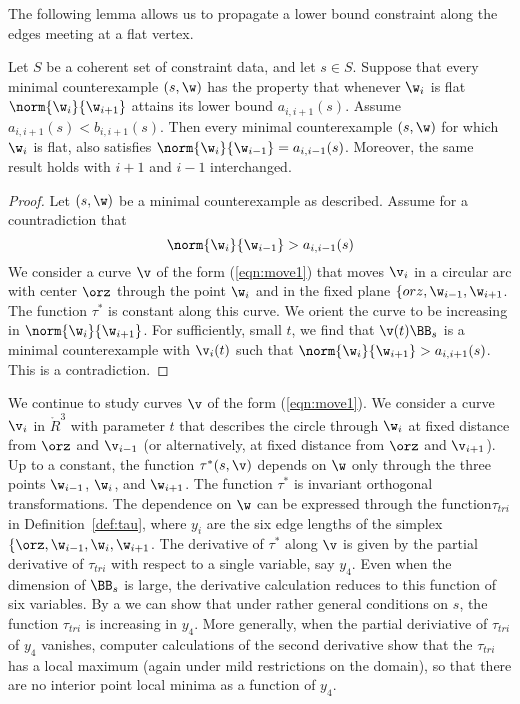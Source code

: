 The following lemma allows us to propagate a lower bound constraint
along the edges meeting at a flat vertex.

\begin{lemma} Let $S$ be a coherent set of constraint data, and let $s\in S$.
Suppose that every minimal counterexample $(s,\w)$ has the
property that whenever $\w_i$ is flat $\norm{\w_i}{\w_{i+1}}$ attains its
lower bound $a_{i,i+1}(s)$.   Assume $a_{i,i+1}(s)<b_{i,i+1}(s)$.
Then every minimal counterexample $(s,\w)$
for which $\w_i$ is flat, also satisfies $\norm{\w_i}{\w_{i-1}}=a_{i,i-1}(s)$.
Moreover, the same result holds with $i+1$ and $i-1$ interchanged.
\end{lemma}

\begin{proof}
Let $(s,\w)$ be a minimal counterexample as described.
Assume for a countradiction that 
\[
\norm{\w_i}{\w_{i-1}}>a_{i,i-1}(s)
\]
We consider a curve $\v$ of the form (\ref{eqn:move1}) that moves $\v_i$
in a circular arc with center $\orz$ through the point $\w_i$ and in
the fixed plane $\{orz,\w_{i-1},\w_{i+1}$.  The function $\tau^*$ is
constant along this curve.  We orient the curve to be increasing
in $\norm{\w_i}{\w_{i+1}}$.  For sufficiently, small $t$, we find that
$\v(t)\BB_s$ is a minimal counterexample with $\v_i(t)$ such that
$\norm{\w_i}{\w_{i+1}} > a_{i,i+1}(s)$. This is a contradiction.
\end{proof}

\begin{remark}\label{rem:contract}
  We continue to study curves $\v$ of the form (\ref{eqn:move1}).  We
  consider a curve $\v_i$ in $\ring{R}^3$ with parameter $t$ that
  describes the circle through $\w_i$ at fixed distance from $\orz$
  and $\v_{i-1}$ (or alternatively, at fixed distance from $\orz$ and
  $\v_{i+1}$).  Up to a constant, the function $\tau^*(s,\v)$ depends
  on $\w$ only through the three points $\w_{i-1}$, $\w_i$, and
  $\w_{i+1}$.  The function $\tau^*$ is invariant orthogonal
  transformations.  The dependence on $\w$ can be expressed through
  the function$\tau_{tri}$ in Definition~\ref{def:tau}, where $y_i$
  are the six edge lengths of the simplex
  $\{\orz,\w_{i-1},\w_i,\w_{i+1}$.  The derivative of $\tau^*$ along
  $\v$ is given by the partial derivative of $\tau_{tri}$ with respect
  to a single variable, say $y_4$.  Even when the dimension of $\BB_s$
  is large, the derivative calculation reduces to this function of six
  variables.  By a  we can show that under rather
  general conditions on $s$, the function $\tau_{tri}$ is increasing
  in $y_4$.  More generally, when the partial deriviative of
  $\tau_{tri}$ of $y_4$ vanishes, computer calculations of the second
  derivative show that the $\tau_{tri}$ has a local maximum (again
  under mild restrictions on the domain), so that there are no
  interior point local minima as a function of $y_4$.
\end{remark}

